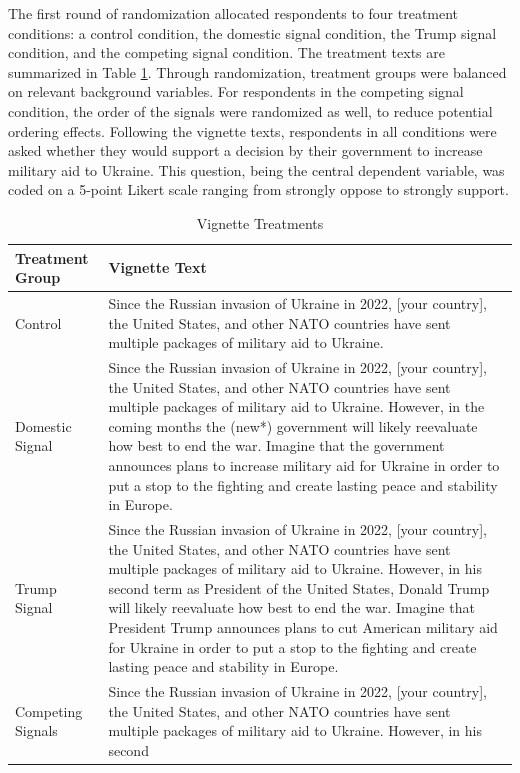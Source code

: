 The first round of randomization allocated respondents to four treatment conditions: a control condition, the domestic signal condition, the Trump signal condition, and the competing signal condition. The treatment texts are summarized in Table \ref{fig:treatment_table}. Through randomization, treatment groups were balanced on relevant background variables. For respondents in the competing signal condition, the order of the signals were randomized as well, to reduce potential ordering effects. Following the vignette texts, respondents in all conditions were asked whether they would support a decision by their government to increase military aid to Ukraine. This question, being the central dependent variable, was coded on a 5-point Likert scale ranging from strongly oppose to strongly support. 

  \begin{table}[H]
  \centering
  \footnotesize
  \begin{threeparttable}
  \caption{Vignette Treatments}
  \label{fig:treatment_table}
  \begin{tabular}{p{2.5cm}p{11.5cm}}
  \toprule
  \textbf{Treatment Group} & \textbf{Vignette Text} \\
  \midrule
  Control & Since the Russian invasion of Ukraine in 2022, [your country], the United States, and other NATO countries have sent multiple packages of military aid to Ukraine. \\
  \midrule
  Domestic Signal & Since the Russian invasion of Ukraine in 2022, [your country], the United States, and other NATO countries have sent multiple packages of military aid to Ukraine. However, in the coming
  months the (new*) government will likely reevaluate how best to end the war. Imagine that the government announces plans to increase military aid for Ukraine in order to put a stop to the fighting and create
   lasting peace and stability in Europe. \\
  \midrule
  Trump Signal & Since the Russian invasion of Ukraine in 2022, [your country], the United States, and other NATO countries have sent multiple packages of military aid to Ukraine. However, in his second term
  as President of the United States, Donald Trump will likely reevaluate how best to end the war. Imagine that President Trump announces plans to cut American military aid for Ukraine in order to put a stop to
   the fighting and create lasting peace and stability in Europe. \\
  \midrule
  Competing Signals & Since the Russian invasion of Ukraine in 2022, [your country], the United States, and other NATO countries have sent multiple packages of military aid to Ukraine. However, in his second

\end{tabular}
\end{threeparttable}
\end{table}
